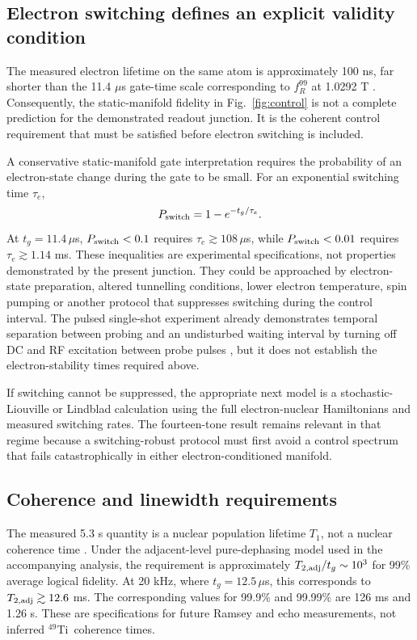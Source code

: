 \documentclass[11pt]{article}
\newcommand{\Ti}{$^{49}$Ti}
\newcommand{\fR}{f_R}
\begin{document}
\subsection{Electron switching defines an explicit validity condition}
The measured electron lifetime on the same atom is approximately 100 ns, far shorter than the 11.4 $\mu$s gate-time scale corresponding to $\fR^{99}$ at 1.0292 T \cite{stolte2025}. Consequently, the static-manifold fidelity in Fig.~\ref{fig:control} is not a complete prediction for the demonstrated readout junction. It is the coherent control requirement that must be satisfied before electron switching is included.

A conservative static-manifold gate interpretation requires the probability of an electron-state change during the gate to be small. For an exponential switching time $\tau_e$,
\begin{equation}
P_{\rm switch}=1-e^{-t_g/\tau_e}.
\end{equation}
At $t_g=11.4\,\mu$s, $P_{\rm switch}<0.1$ requires $\tau_e\gtrsim108\,\mu$s, while $P_{\rm switch}<0.01$ requires $\tau_e\gtrsim1.14$ ms. These inequalities are experimental specifications, not properties demonstrated by the present junction. They could be approached by electron-state preparation, altered tunnelling conditions, lower electron temperature, spin pumping or another protocol that suppresses switching during the control interval. The pulsed single-shot experiment already demonstrates temporal separation between probing and an undisturbed waiting interval by turning off DC and RF excitation between probe pulses \cite{stolte2025}, but it does not establish the electron-stability times required above.

If switching cannot be suppressed, the appropriate next model is a stochastic-Liouville or Lindblad calculation using the full electron-nuclear Hamiltonians and measured switching rates. The fourteen-tone result remains relevant in that regime because a switching-robust protocol must first avoid a control spectrum that fails catastrophically in either electron-conditioned manifold.

\subsection{Coherence and linewidth requirements}
The measured 5.3 s quantity is a nuclear population lifetime $T_1$, not a nuclear coherence time \cite{stolte2025}. Under the adjacent-level pure-dephasing model used in the accompanying analysis, the requirement is approximately $T_{2,{\rm adj}}/t_g\sim10^3$ for 99\% average logical fidelity. At 20 kHz, where $t_g=12.5\,\mu$s, this corresponds to $T_{2,{\rm adj}}\gtrsim12.6$ ms. The corresponding values for 99.9\% and 99.99\% are 126 ms and 1.26 s. These are specifications for future Ramsey and echo measurements, not inferred \Ti\ coherence times.
\end{document}
